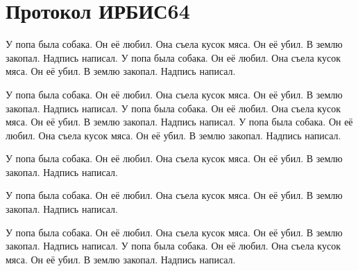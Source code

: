 \chapter{Протокол ИРБИС64}

У попа была собака. Он её любил. Она съела кусок мяса. Он её убил. В землю закопал. Надпись написал. У попа была собака. Он её любил. Она съела кусок мяса. Он её убил. В землю закопал. Надпись написал.

У попа была собака. Он её любил. Она съела кусок мяса. Он её убил. В землю закопал. Надпись написал. У попа была собака. Он её любил. Она съела кусок мяса. Он её убил. В землю закопал. Надпись написал. У попа была собака. Он её любил. Она съела кусок мяса. Он её убил. В землю закопал. Надпись написал.

У попа была собака. Он её любил. Она съела кусок мяса. Он её убил. В землю закопал. Надпись написал.

У попа была собака. Он её любил. Она съела кусок мяса. Он её убил. В землю закопал. Надпись написал.

У попа была собака. Он её любил. Она съела кусок мяса. Он её убил. В землю закопал. Надпись написал. У попа была собака. Он её любил. Она съела кусок мяса. Он её убил. В землю закопал. Надпись написал.